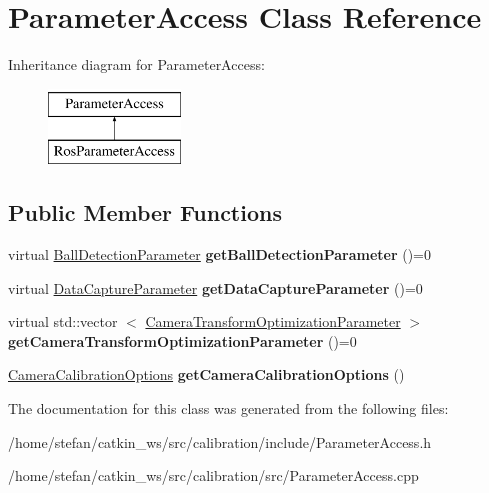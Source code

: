 \hypertarget{classParameterAccess}{\section{\-Parameter\-Access \-Class \-Reference}
\label{classParameterAccess}
}
\-Inheritance diagram for \-Parameter\-Access\-:\begin{figure}[H]
\begin{center}
\leavevmode
\includegraphics[height=2.000000cm]{classParameterAccess}
\end{center}
\end{figure}
\subsection*{\-Public \-Member \-Functions}
\begin{DoxyCompactItemize}
\item 
\hypertarget{classParameterAccess_adf4c641e72e4cf2cf85c161e62141695}{virtual \hyperlink{classBallDetectionParameter}{\-Ball\-Detection\-Parameter} {\bfseries get\-Ball\-Detection\-Parameter} ()=0}\label{classParameterAccess_adf4c641e72e4cf2cf85c161e62141695}

\item 
\hypertarget{classParameterAccess_ac2afa16de939099c0501eb20167dbac6}{virtual \hyperlink{classDataCaptureParameter}{\-Data\-Capture\-Parameter} {\bfseries get\-Data\-Capture\-Parameter} ()=0}\label{classParameterAccess_ac2afa16de939099c0501eb20167dbac6}

\item 
\hypertarget{classParameterAccess_a367559bb83e49df23ff0310d7fa0c1c2}{virtual std\-::vector\*
$<$ \hyperlink{classCameraTransformOptimizationParameter}{\-Camera\-Transform\-Optimization\-Parameter} $>$ {\bfseries get\-Camera\-Transform\-Optimization\-Parameter} ()=0}\label{classParameterAccess_a367559bb83e49df23ff0310d7fa0c1c2}

\item 
\hypertarget{classParameterAccess_a2445da8bfe762d221490e456d72130e4}{\hyperlink{classCameraCalibrationOptions}{\-Camera\-Calibration\-Options} {\bfseries get\-Camera\-Calibration\-Options} ()}\label{classParameterAccess_a2445da8bfe762d221490e456d72130e4}

\end{DoxyCompactItemize}


\-The documentation for this class was generated from the following files\-:\begin{DoxyCompactItemize}
\item 
/home/stefan/catkin\-\_\-ws/src/calibration/include/\-Parameter\-Access.\-h\item 
/home/stefan/catkin\-\_\-ws/src/calibration/src/\-Parameter\-Access.\-cpp\end{DoxyCompactItemize}

